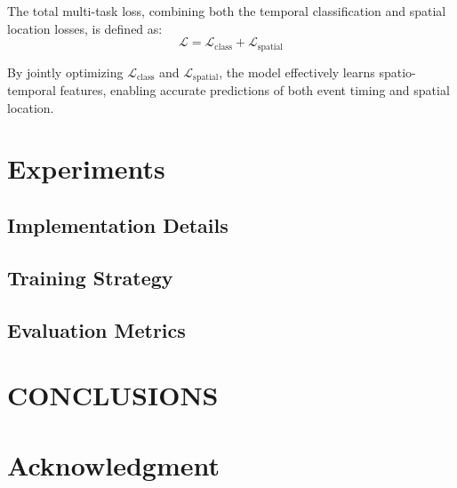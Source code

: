 \documentclass[conference]{IEEEtran}
\begin{document}
The total multi-task loss, combining both the temporal classification and spatial location losses, is defined as:
\[
\mathcal{L} = \mathcal{L}_{\text{class}} + \mathcal{L}_{\text{spatial}}
\]

By jointly optimizing \(\mathcal{L}_{\text{class}}\) and \(\mathcal{L}_{\text{spatial}}\), the model effectively learns spatio-temporal features, enabling accurate predictions of both event timing and spatial location.



\section{Experiments}
\subsection{Implementation Details}
\subsection{Training Strategy}
\subsection{Evaluation Metrics}

\section{CONCLUSIONS}
\section*{Acknowledgment}



\end{document}
